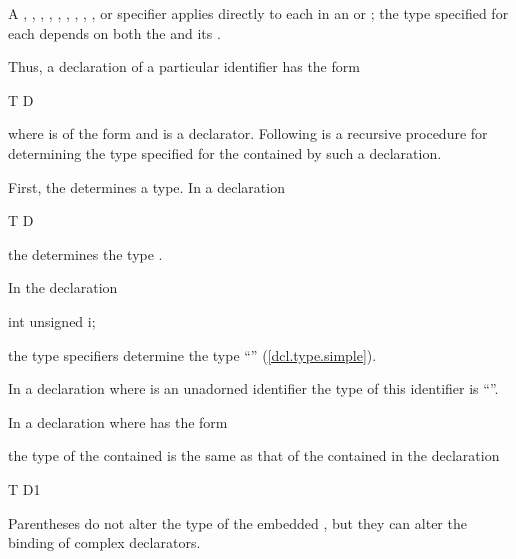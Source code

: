 \pnum
A
,
,
,
,
,
,
,
,
,
or
specifier applies directly to each 
in an  or ;
the type specified for each  depends on
both the  and its .

\pnum
Thus, a declaration of a particular identifier has the form

\begin{codeblock}
T D
\end{codeblock}

where
is of the form 
and
is a declarator.
Following is a recursive procedure for determining
the type specified for the contained
by such a declaration.

\pnum
First, the
determines a type.
In a declaration

\begin{codeblock}
T D
\end{codeblock}

the
determines the type
.
\begin{example}
In the declaration

\begin{codeblock}
int unsigned i;
\end{codeblock}

the type specifiers
determine the type
``''
(\ref{dcl.type.simple}).
\end{example}

\pnum
In a declaration
where
is an unadorned identifier the type of this identifier is
``''.

\pnum
In a declaration
where
has the form

\begin{ncsimplebnf}
\terminal{(}  \terminal{)}
\end{ncsimplebnf}

the type of the contained
is the same as that of the contained
in the declaration
\begin{codeblock}
T D1
\end{codeblock}
%
Parentheses do not alter the type of the embedded
,
but they can alter the binding of complex declarators.

